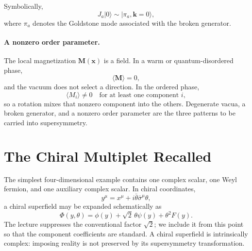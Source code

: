\begin{classroomqa}
\end{classroomqa}

\begin{classroomqa}
\end{classroomqa}

Symbolically,
\begin{equation}
J_a|0\rangle
\sim
|\pi_a,\mathbf k=0\rangle,
\label{eq:l9-generator-goldstone}
\end{equation}
where \(\pi_a\) denotes the Goldstone mode associated with the broken generator.

\paragraph{A nonzero order parameter.}
The local magnetization \(\mathbf M(\mathbf x)\) is a field. In a warm or quantum-disordered phase,
\begin{equation}
\langle\mathbf M\rangle=0,
\end{equation}
and the vacuum does not select a direction. In the ordered phase,
\begin{equation}
\langle M_i\rangle\neq0
\quad\text{for at least one component }i,
\label{eq:l9-magnetization-order}
\end{equation}
so a rotation mixes that nonzero component into the others. Degenerate vacua, a broken generator, and a nonzero order parameter are the three patterns to be carried into supersymmetry.

\section{The Chiral Multiplet Recalled}

The simplest four-dimensional example contains one complex scalar, one Weyl fermion, and one auxiliary complex scalar. In chiral coordinates,
\begin{equation}
y^\mu=x^\mu+i\bar\theta\bar\sigma^\mu\theta,
\end{equation}
a chiral superfield may be expanded schematically as
\begin{equation}
\Phi(y,\theta)=
\phi(y)+\sqrt2\,\theta\psi(y)+\theta^2F(y).
\label{eq:l9-chiral-expansion}
\end{equation}
The lecture suppresses the conventional factor \(\sqrt2\); we include it from this point so that the component coefficients are standard. A chiral superfield is intrinsically complex: imposing reality is not preserved by its supersymmetry transformation.

